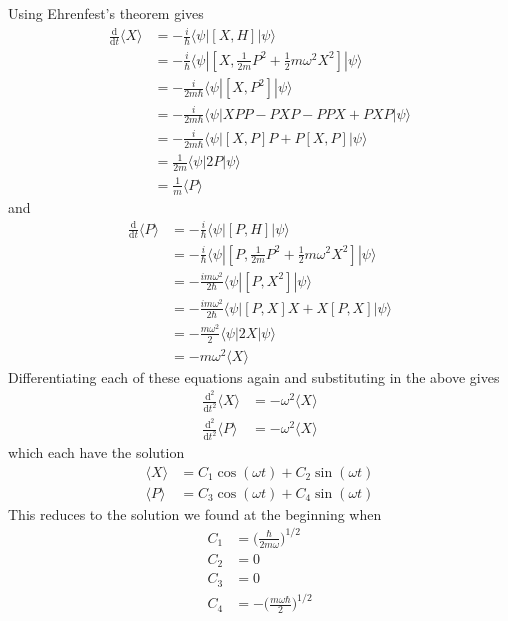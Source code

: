 \documentclass[../principles-of-quantum-mechanics.tex]{subfiles}
\begin{document}
\begin{questions}
\begin{solution}
			Using Ehrenfest's theorem gives
			\begin{align*}
				\frac{\mathrm{d}}{\mathrm{d}t}\langle X\rangle &= -\frac{i}{\hbar}\langle \psi|[X, H]|\psi\rangle \\
				&= -\frac{i}{\hbar}\langle\psi|[X, \tfrac{1}{2m}P^2 + \tfrac{1}{2}m\omega^2X^2]|\psi\rangle \\
				&= -\frac{i}{2m\hbar}\langle\psi|[X, P^2]|\psi\rangle \\
				&= -\frac{i}{2m\hbar}\langle\psi|XPP - PXP - PPX + PXP|\psi\rangle \\
				&= -\frac{i}{2m\hbar}\langle\psi|[X, P]P + P[X, P]|\psi\rangle \\
				&= \frac{1}{2m}\langle\psi| 2P|\psi\rangle \\
				&= \frac{1}{m}\langle P\rangle
			\end{align*}
			and
			\begin{align*}
				\frac{\mathrm{d}}{\mathrm{d}t}\langle P\rangle &= -\frac{i}{\hbar}\langle \psi|[P, H]|\psi\rangle \\
				&= -\frac{i}{\hbar}\langle\psi|[P, \tfrac{1}{2m}P^2 + \tfrac{1}{2}m\omega^2X^2]|\psi\rangle \\
				&= -\frac{im\omega^2}{2\hbar}\langle\psi|[P, X^2]|\psi\rangle \\
				&= -\frac{im\omega^2}{2\hbar}\langle\psi|[P, X]X + X[P, X]|\psi\rangle \\
				&= -\frac{m\omega^2}{2}\langle\psi|2X|\psi\rangle \\
				&= -m\omega^2\langle X\rangle
			\end{align*}
			Differentiating each of these equations again and substituting in the above gives
			\begin{align*}
				\frac{\mathrm{d}^2}{\mathrm{d}t^2}\langle X\rangle &= -\omega^2\langle X\rangle \\
				\frac{\mathrm{d}^2}{\mathrm{d}t^2}\langle P\rangle &= -\omega^2\langle X\rangle 
			\end{align*}
			which each have the solution
			\begin{align*}
				\langle X\rangle &= C_1\cos(\omega t) + C_2\sin(\omega t) \\
				\langle P\rangle&= C_3\cos(\omega t) + C_4\sin(\omega t)
			\end{align*}
			This reduces to the solution we found at the beginning when
			\begin{align*}
				C_1 &= \Big(\frac{\hbar}{2m\omega}\Big)^{1/2} \\
				C_2 &= 0 \\
				C_3 &= 0 \\
				C_4 &= -\Big(\frac{m\omega\hbar}{2}\Big)^{1/2}
			\end{align*}
		\end{solution}
		

\end{questions}
\end{document}
